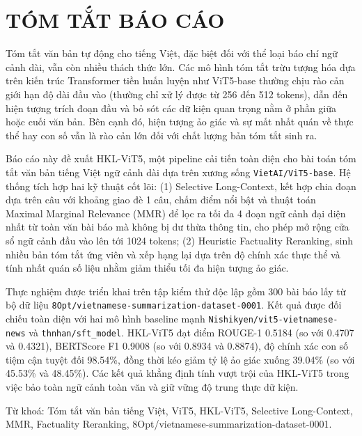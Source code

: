 \chapter*{TÓM TẮT BÁO CÁO}

Tóm tắt văn bản tự động cho tiếng Việt, đặc biệt đối với thể loại báo chí ngữ cảnh dài, vẫn còn nhiều thách thức lớn. Các mô hình tóm tắt trừu tượng hóa dựa trên kiến trúc Transformer tiền huấn luyện như ViT5-base thường chịu rào cản giới hạn độ dài đầu vào (thường chỉ xử lý được từ 256 đến 512 tokens), dẫn đến hiện tượng trích đoạn đầu và bỏ sót các dữ kiện quan trọng nằm ở phần giữa hoặc cuối văn bản. Bên cạnh đó, hiện tượng ảo giác và sự mất nhất quán về thực thể hay con số vẫn là rào cản lớn đối với chất lượng bản tóm tắt sinh ra.

Báo cáo này đề xuất HKL-ViT5, một pipeline cải tiến toàn diện cho bài toán tóm tắt văn bản tiếng Việt ngữ cảnh dài dựa trên xương sống \texttt{VietAI/ViT5-base}. Hệ thống tích hợp hai kỹ thuật cốt lõi: (1) Selective Long-Context, kết hợp chia đoạn dựa trên câu với khoảng giao đè 1 câu, chấm điểm nổi bật và thuật toán Maximal Marginal Relevance (MMR) để lọc ra tối đa 4 đoạn ngữ cảnh đại diện nhất từ toàn văn bài báo mà không bị dư thừa thông tin, cho phép mở rộng cửa sổ ngữ cảnh đầu vào lên tới 1024 tokens; (2) Heuristic Factuality Reranking, sinh nhiều bản tóm tắt ứng viên và xếp hạng lại dựa trên độ chính xác thực thể và tính nhất quán số liệu nhằm giảm thiểu tối đa hiện tượng ảo giác.

Thực nghiệm được triển khai trên tập kiểm thử độc lập gồm 300 bài báo lấy từ bộ dữ liệu \texttt{8Opt/vietnamese-summarization-dataset-0001}. Kết quả được đối chiếu toàn diện với hai mô hình baseline mạnh \texttt{Nishikyen/vit5-vietnamese-news} và \texttt{thnhan/sft\_model}. HKL-ViT5 đạt điểm ROUGE-1 0.5184 (so với 0.4707 và 0.4321), BERTScore F1 0.9008 (so với 0.8934 và 0.8874), độ chính xác con số tiệm cận tuyệt đối 98.54\%, đồng thời kéo giảm tỷ lệ ảo giác xuống 39.04\% (so với 45.53\% và 48.45\%). Các kết quả khẳng định tính vượt trội của HKL-ViT5 trong việc bảo toàn ngữ cảnh toàn văn và giữ vững độ trung thực dữ kiện.

\vspace{0.4em}

Từ khoá: Tóm tắt văn bản tiếng Việt, ViT5, HKL-ViT5, Selective Long-Context, MMR, Factuality Reranking, 8Opt/vietnamese-summarization-dataset-0001.


